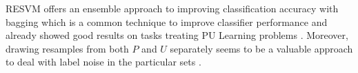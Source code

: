 RESVM offers an ensemble approach to improving classification accuracy with bagging which is a common technique to improve classifier performance and already showed good results on tasks treating PU Learning problems \cite{journals/prl/MordeletV14,journals/ml/Breiman00,breiman:ml96}. Moreover, drawing resamples from both \(P\) and \(U\) separately seems to be a valuable approach to deal with label noise in the particular sets \cite{Claesen:2014}.


